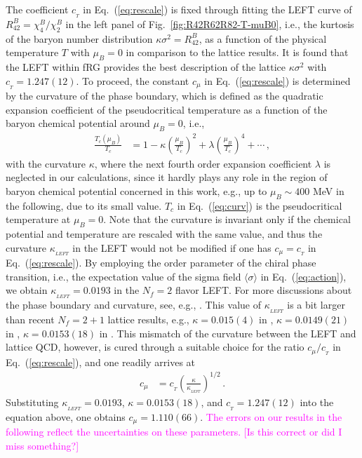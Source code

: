 \documentclass[%
reprint,
superscriptaddress,
showpacs,preprintnumbers,
 amsmath,amssymb,
 aps,
prd,
]{revtex4-1}
\def\Fig#1{Fig.~\ref{#1}} \def\Tab#1{Tab.~\ref{#1}}
\def\Eq#1{Eq.~(\ref{#1})}
\newcommand{\colfab}[1]{\textcolor{magenta}{#1}}
\begin{document}
The coefficient $c_{_{T}}$ in \Eq{eq:rescale} is fixed through fitting the LEFT curve of $R^{B}_{42}=\chi^{B}_{4}/\chi^{B}_{2}$ in the left panel of \Fig{fig:R42R62R82-T-muB0}, i.e., the kurtosis of the baryon number distribution $\kappa \sigma^2=R^{B}_{42}$, 
as a function of the physical temperature $T$ with $\mu_B=0$ in comparison to the lattice results. It is found that the LEFT within fRG provides the best description of the lattice $\kappa \sigma^2$ with $c_{_{T}}=1.247(12)$. To proceed, the constant $c_{\mu}$ in \Eq{eq:rescale} is determined by the curvature of the phase boundary, which is defined as the quadratic expansion coefficient of the pseudocritical temperature as a function of the baryon chemical potential around $\mu_B=0$, i.e.,
%
\begin{align}
  \frac{T_c(\mu_B)}{T_c}&=1-\kappa \left(\frac{\mu_B}{T_c}\right)^2+\lambda \left(\frac{\mu_B}{T_c}\right)^4+\cdots\,,\label{eq:curv}
\end{align}
%
with the curvature $\kappa$, where the next fourth order expansion coefficient $\lambda$ is neglected in our calculations, since it hardly plays any role in the region of baryon chemical potential concerned in this work, e.g., up to $\mu_B\sim 400$ MeV in the following, due to its small value. $T_c$ in \Eq{eq:curv} is the pseudocritical temperature at $\mu_B=0$. Note that the curvature is invariant only if the chemical potential and temperature are rescaled with the same value, and thus the curvature $\kappa_{_{LEFT}}$ in the LEFT would not be modified if one has $c_{\mu}=c_{_{T}}$ in \Eq{eq:rescale}. By employing the order parameter of the chiral phase transition, i.e., the expectation value of the sigma field $\langle \sigma \rangle$ in \Eq{eq:action}, we obtain $\kappa_{_{LEFT}}=0.0193$ in the $N_f=2$ flavor LEFT. For more discussions about the phase boundary and curvature, see, e.g., \cite{Fu:2019hdw}. This value of $\kappa_{_{LEFT}}$ is a bit larger than recent $N_f = 2+1$ lattice results, e.g., $\kappa=0.015(4)$ in \cite{Bazavov:2018mes}, $\kappa=0.0149(21)$ in \cite{Bellwied:2015rza}, $\kappa=0.0153(18)$ in \cite{Borsanyi:2020fev}. This mismatch of the curvature between the LEFT and lattice QCD, however, is cured through a suitable choice for the ratio $c_{\mu}/c_{_{T}}$ in \Eq{eq:rescale}, and one readily arrives at
%
\begin{align}
  c_{\mu}&=c_{_{T}}\left(\frac{\kappa}{\kappa_{_{LEFT}}}\right)^{1/2}\,.\label{eq:cmu}
\end{align}
%
Substituting $\kappa_{_{LEFT}}=0.0193$, $\kappa=0.0153(18)$, and $c_{_{T}}=1.247(12)$ into the equation above, one obtains $c_{\mu}=1.110(66)$.
\colfab{The errors on our results in the following reflect the uncertainties on these parameters. [Is this correct or did I miss something?]}
\end{document}
